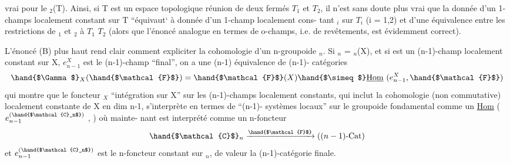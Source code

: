  

vrai pour le \hand{$\Pi$}$_2$(T). Ainsi, si T est un espace topologique réunion de
deux fermés $T_1$ et $T_2$, il n'est sans doute plus vrai que la donnée d'un 1-champs
localement constant sur T ``équivaut` à  donnée d'un 1-champ localement cons-%
tant $_i$ sur $T_i$ (i = 1,2) et d'une équivalence entre les restrictions
de $_1$ et $_2$ à $T_1$ \hand{$\cap$} $T_2$ (alors que l'énoncé analogue en termes de
o-champs, i.e. de revêtements, est évidemment correct).

  L'énoncé (B) plus haut rend clair comment expliciter la cohomologie
d'un n-groupoide $_n$. Si $_n$ = \hand{$\Pi$}$_n$(X), et si  est un (n-1)-champ
localement constant sur X, $e^X_{n-1}$ est le (n-1)-champ ``final'', on a une
(n-1) équivalence de (n-1)- catégories
\[
\hand{$\Gamma$}_X(\hand{$\mathcal{F}$}) = \hand{$\mathcal{F}$}(X) \hand{$\simeq$} \underline{\mathrm{Hom}}\ (e^X_{n-1}, \hand{$\mathcal{F}$})
\]
qui montre que le foncteur \hand{$\Gamma$}$_X$ ``intégration sur X'' sur les (n-1)-champs
localement constants, qui inclut la cohomologie (non commutative) localement
constante de X en dim \hand{$\leq$} n-1, s'interprète en termes de ``(n-1)- systèmes locaux''
sur le groupoide fondamental comme un \uline{Hom} ( $e_{n-1}^{(\hand{$\mathcal{C}_n$})}$ , ) où mainte-%
nant  est interprété comme un n-foncteur
\[
\hand{$\mathcal{C}$}_n \xrightarrow{\hand{$\mathcal{F}$}} ((n-1)\text{-Cat})
\]
et $e_{n-1}^{(\hand{$\mathcal{C}_n$})}$ est le n-foncteur constant sur $_n$, de valeur la (n-1)-catégorie
finale.

